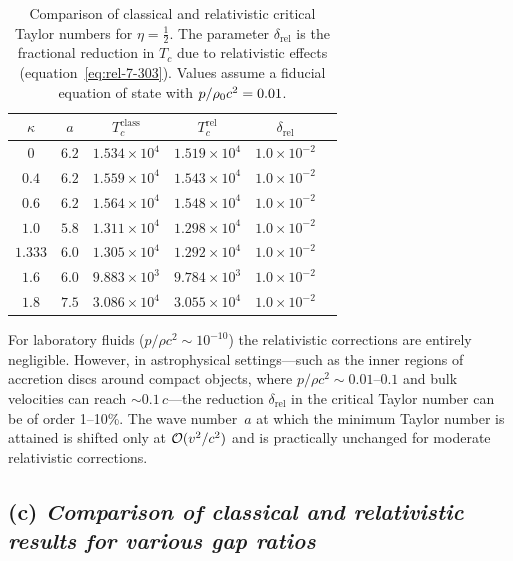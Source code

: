 \begin{table}[ht]
\centering
\caption{Comparison of classical and relativistic critical Taylor
  numbers for $\eta = \frac{1}{2}$.  The parameter $\delta_{\mathrm{rel}}$
  is the fractional reduction in $T_{c}$ due to relativistic effects
  (equation~\eqref{eq:rel-7-303}).  Values assume a fiducial equation
  of state with $p/\rho_0 c^{2}=0.01$.}
\label{tab:rel-XXXIV}
\medskip
\small
\begin{tabular}{cccccc}
\hline
$\kappa$ & $a$ & $T_c^{\mathrm{class}}$
  & $T_c^{\mathrm{rel}}$ & $\delta_{\mathrm{rel}}$ \\
\hline
$0$    & $6.2$ & $1.534\times10^{4}$
  & $1.519\times10^{4}$ & $1.0\times10^{-2}$ \\
$0.4$  & $6.2$ & $1.559\times10^{4}$
  & $1.543\times10^{4}$ & $1.0\times10^{-2}$ \\
$0.6$  & $6.2$ & $1.564\times10^{4}$
  & $1.548\times10^{4}$ & $1.0\times10^{-2}$ \\
$1.0$  & $5.8$ & $1.311\times10^{4}$
  & $1.298\times10^{4}$ & $1.0\times10^{-2}$ \\
$1.333$ & $6.0$ & $1.305\times10^{4}$
  & $1.292\times10^{4}$ & $1.0\times10^{-2}$ \\
$1.6$  & $6.0$ & $9.883\times10^{3}$
  & $9.784\times10^{3}$ & $1.0\times10^{-2}$ \\
$1.8$  & $7.5$ & $3.086\times10^{4}$
  & $3.055\times10^{4}$ & $1.0\times10^{-2}$ \\
\hline
\end{tabular}
\end{table}

\begin{relcorrection}
For laboratory fluids ($p/\rho c^{2}\sim 10^{-10}$) the relativistic
corrections are entirely negligible.  However, in astrophysical
settings---such as the inner regions of accretion discs around compact
objects, where $p/\rho c^{2}\sim 0.01$--$0.1$ and bulk velocities can
reach $\sim 0.1\,c$---the reduction $\delta_{\mathrm{rel}}$ in the
critical Taylor number can be of order 1--10\%.  The wave number~$a$
at which the minimum Taylor number is attained is shifted only at
$\mathcal{O}(v^{2}/c^{2})$ and is practically unchanged for moderate
relativistic corrections.
\end{relcorrection}

\subsection*{(c) \textit{Comparison of classical and relativistic
  results for various gap ratios}}
\label{sec:rel-7-73c}

